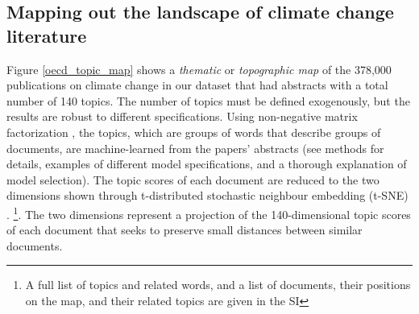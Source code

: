 \documentclass{article}
\begin{document}
\begin{linenumbers}
		
		\subsection*{Mapping out the landscape of climate change literature}
		
		Figure \ref{oecd_topic_map} shows a \emph{thematic} or \emph{topographic map} of the 378,000 publications on climate change in our dataset that had abstracts with a total number of 140 topics. The number of topics must be defined exogenously, but the results are robust to different specifications. Using non-negative matrix factorization \cite{Lee1999}, the topics, which are groups of words that describe groups of documents, are machine-learned from the papers' abstracts (see methods for details, examples of different model specifications, and a thorough explanation of model selection). The topic scores of each document are reduced to the two dimensions shown through t-distributed stochastic neighbour embedding (t-SNE) \cite{vandermaaten2008}. \footnote{A full list of topics and related words, and a list of documents, their positions on the map, and their related topics are given in the SI}. The two dimensions represent a projection of the 140-dimensional topic scores of each document that seeks to preserve small distances between similar documents.
		

\end{linenumbers}
\end{document}
